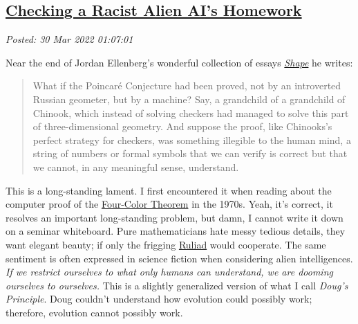 %

\subsection*{\href{https://analyzethedatanotthedrivel.org/2022/03/29/checking-a-racist-alien-ais-homework/}{Checking a Racist Alien AI's Homework}}


\noindent\emph{Posted: 30 Mar 2022 01:07:01}
\vspace{6pt}

Near the end of Jordan Ellenberg's wonderful collection of essays
\emph{\href{https://www.jordanellenberg.com/book/shape/}{Shape}} he
writes:

\begin{quote}
What if the Poincaré Conjecture had been proved, not by an introverted
Russian geometer, but by a machine? Say, a grandchild of a grandchild of
Chinook, which instead of solving checkers had managed to solve this
part of three-dimensional geometry. And suppose the proof, like
Chinooks's perfect strategy for checkers, was something illegible to the
human mind, a string of numbers or formal symbols that we can verify is
correct but that we cannot, in any meaningful sense, understand.
\end{quote}

This is a long-standing lament. I first encountered it when reading
about the computer proof of the
\href{https://people.cs.umass.edu/~brun/pubs/pubs/Brun02four-color.pdf}{Four-Color
Theorem} in the 1970s. Yeah, it's correct, it resolves an important
long-standing problem, but damn, I cannot write it down on a seminar
whiteboard. Pure mathematicians hate messy tedious details, they want
elegant beauty; if only the frigging
\href{https://writings.stephenwolfram.com/2021/11/the-concept-of-the-ruliad/}{Ruliad}
would cooperate. The same sentiment is often expressed in science
fiction when considering alien intelligences. \emph{If we restrict
ourselves to what only humans can understand, we are dooming ourselves
to ourselves.} This is a slightly generalized version of what I call
\emph{Doug's Principle}. Doug couldn't understand how evolution could
possibly work; therefore, evolution cannot possibly work.

